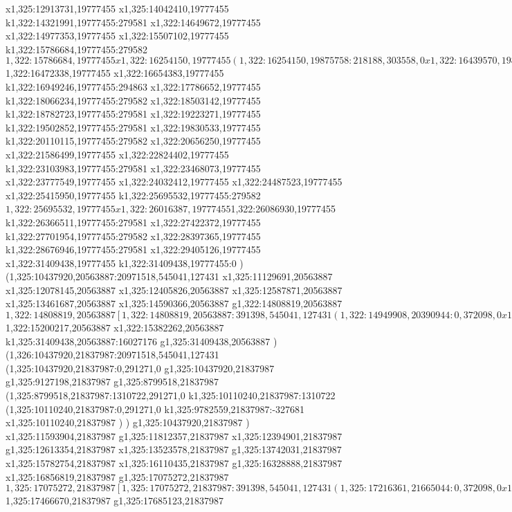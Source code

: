{x1,325:12913731,19777455
x1,325:14042410,19777455
k1,322:14321991,19777455:279581
x1,322:14649672,19777455
x1,322:14977353,19777455
x1,322:15507102,19777455
k1,322:15786684,19777455:279582
$1,322:15786684,19777455
x1,322:16254150,19777455
(1,322:16254150,19875758:218188,303558,0
x1,322:16439570,19875758
)
$1,322:16472338,19777455
x1,322:16654383,19777455
k1,322:16949246,19777455:294863
x1,322:17786652,19777455
k1,322:18066234,19777455:279582
x1,322:18503142,19777455
k1,322:18782723,19777455:279581
x1,322:19223271,19777455
k1,322:19502852,19777455:279581
x1,322:19830533,19777455
k1,322:20110115,19777455:279582
x1,322:20656250,19777455
x1,322:21586499,19777455
x1,322:22824402,19777455
k1,322:23103983,19777455:279581
x1,322:23468073,19777455
x1,322:23777549,19777455
x1,322:24032412,19777455
x1,322:24487523,19777455
x1,322:25415950,19777455
k1,322:25695532,19777455:279582
$1,322:25695532,19777455
x1,322:26016387,19777455
$1,322:26086930,19777455
k1,322:26366511,19777455:279581
x1,322:27422372,19777455
k1,322:27701954,19777455:279582
x1,322:28397365,19777455
k1,322:28676946,19777455:279581
x1,322:29405126,19777455
x1,322:31409438,19777455
k1,322:31409438,19777455:0
)
(1,325:10437920,20563887:20971518,545041,127431
x1,325:11129691,20563887
x1,325:12078145,20563887
x1,325:12405826,20563887
x1,325:12587871,20563887
x1,325:13461687,20563887
x1,325:14590366,20563887
g1,322:14808819,20563887
$1,322:14808819,20563887
[1,322:14808819,20563887:391398,545041,127431
(1,322:14949908,20390944:0,372098,0
x1,322:15277589,20390944
)
(1,322:14808819,20563887:391398,455111,127431
x1,322:15129674,20563887
)
]
$1,322:15200217,20563887
x1,322:15382262,20563887
k1,325:31409438,20563887:16027176
g1,325:31409438,20563887
)
(1,326:10437920,21837987:20971518,545041,127431
(1,325:10437920,21837987:0,291271,0
g1,325:10437920,21837987
g1,325:9127198,21837987
g1,325:8799518,21837987
(1,325:8799518,21837987:1310722,291271,0
k1,325:10110240,21837987:1310722
(1,325:10110240,21837987:0,291271,0
k1,325:9782559,21837987:-327681
x1,325:10110240,21837987
)
)
g1,325:10437920,21837987
)
x1,325:11593904,21837987
g1,325:11812357,21837987
x1,325:12394901,21837987
g1,325:12613354,21837987
x1,325:13523578,21837987
g1,325:13742031,21837987
x1,325:15782754,21837987
x1,325:16110435,21837987
g1,325:16328888,21837987
x1,325:16856819,21837987
g1,325:17075272,21837987
$1,325:17075272,21837987
[1,325:17075272,21837987:391398,545041,127431
(1,325:17216361,21665044:0,372098,0
x1,325:17544042,21665044
)
(1,325:17075272,21837987:391398,455111,127431
x1,325:17396127,21837987
)
]
$1,325:17466670,21837987
g1,325:17685123,21837987
}

